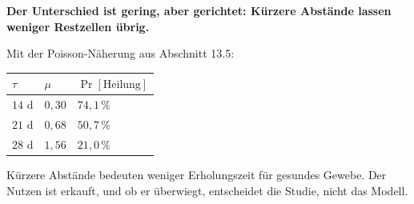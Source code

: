 \begin{aufgabe}
\begin{center}
\begin{minipage}{0.9\textwidth}
\textbf{Der Unterschied ist gering, aber gerichtet: Kürzere Abstände lassen weniger Restzellen übrig.}
\end{minipage}
\end{center}

Mit der Poisson-Näherung aus Abschnitt 13.5:
\begin{center}
\renewcommand{\arraystretch}{1.45}
\begin{tabular}{@{}P{1.8cm}P{2.2cm}P{2.8cm}@{}}
\toprule
$\tau$ & $\mu$ & $\Pr[\text{Heilung}]$\\
\midrule
$14$ d & $0{,}30$ & $74{,}1\,\%$\\
$21$ d & $0{,}68$ & $50{,}7\,\%$\\
$28$ d & $1{,}56$ & $21{,}0\,\%$\\
\bottomrule
\end{tabular}
\end{center}

\begin{center}
\begin{minipage}{0.88\textwidth}
\end{minipage}
\end{center}

Kürzere Abstände bedeuten weniger Erholungszeit für gesundes Gewebe. Der Nutzen ist erkauft, und ob er überwiegt, entscheidet die Studie, nicht das Modell.
\end{aufgabe}

